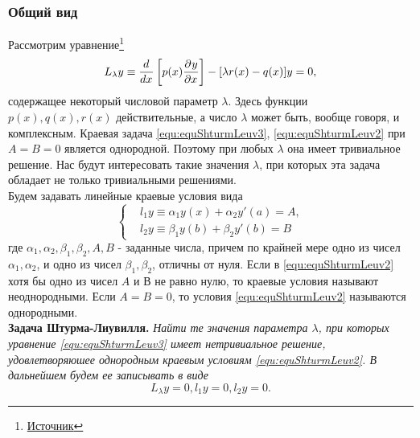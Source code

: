 \subsubsection{Общий вид}
Рассмотрим уравнение\footnote{\href{http://vicaref.mgsu.ru/ODE/lec4.html}{Источник}}	
 \begin{equation}
	L_\lambda y \equiv \frac{d^{}}{dx^{}} \left[p(x) \frac{\partial^{}y}{\partial x^{}} \right] - [\lambda r(x) - q(x)] y = 0,
	\label{equ:equShturmLeuv3}
 \end{equation}
содержащее некоторый числовой параметр $\lambda$. Здесь функции $p(x), q(x), r(x)$ действительные, а число $\lambda$ может быть, вообще говоря, и комплексным. Краевая задача \eqref{equ:equShturmLeuv3}, \eqref{equ:equShturmLeuv2} при $A = B = 0$ является однородной. Поэтому при любых $\lambda$ она имеет тривиальное решение. Нас будут интересовать такие значения $\lambda$, при которых эта задача обладает не только тривиальными решениями.\\
Будем задавать линейные краевые условия вида
 \begin{equation}
	\left\{
	\begin{aligned}
		&l_1 y \equiv \alpha_1 y(x) + \alpha_2 y'(a) = A,\\
		&l_2 y \equiv \beta_1 y(b) + \beta_2 y'(b) = B
	\end{aligned}
	\right.
	\label{equ:equShturmLeuv2}
 \end{equation}
где $\alpha_1, \alpha_2, \beta_1, \beta_2, A, B$ - заданные числа, причем по крайней мере одно из чисел $\alpha_1, \alpha_2$, и одно из чисел $\beta_1, \beta_2$, отличны от нуля. Если в \eqref{equ:equShturmLeuv2} хотя бы одно из чисел $A$ и $В$ не равно нулю, то краевые условия называют неоднородными. Если $A = B = 0$, то условия \eqref{equ:equShturmLeuv2} называются однородными.\\ %


\textbf{Задача Штурма-Лиувилля.} \textit{Найти те значения параметра $\lambda$, при которых уравнение \eqref{equ:equShturmLeuv3} имеет нетривиальное решение, удовлетворяюшее однородным краевым условиям \eqref{equ:equShturmLeuv2}. В дальнейшем будем ее записывать в виде}
\[
	L_\lambda y = 0,  l_1y = 0,  l_2y = 0.
 \]

